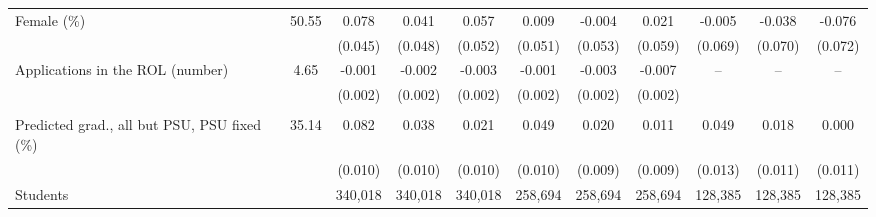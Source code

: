 \begin{tabular}{lc*{9}{c}}
Female (\%) &  50.55 &  0.078\sym{*} &  0.041 &  0.057 &  0.009 & -0.004 &  0.021 & -0.005 & -0.038 & -0.076 \\
 &  & (0.045) & (0.048) & (0.052) & (0.051) & (0.053) & (0.059) & (0.069) & (0.070) & (0.072) \\
Applications in the ROL (number) &   4.65 & -0.001 & -0.002 & -0.003\sym{**} & -0.001 & -0.003 & -0.007\sym{***} & -- & -- & -- \\
 &  & (0.002) & (0.002) & (0.002) & (0.002) & (0.002) & (0.002) &  &  &  \\
\addlinespace
\multicolumn{11}{l}{\textit{Joint tests}} \\
Predicted grad., all but PSU, PSU fixed (\%) &  35.14 &  0.082\sym{***} &  0.038\sym{***} &  0.021\sym{**} &  0.049\sym{***} &  0.020\sym{**} &  0.011 &  0.049\sym{***} &  0.018 &  0.000 \\
 &  & (0.010) & (0.010) & (0.010) & (0.010) & (0.009) & (0.009) & (0.013) & (0.011) & (0.011) \\
\midrule
Students &  &   340,018 &   340,018 &   340,018 &   258,694 &   258,694 &   258,694 &   128,385 &   128,385 &   128,385 \\
\bottomrule
\end{tabular}
